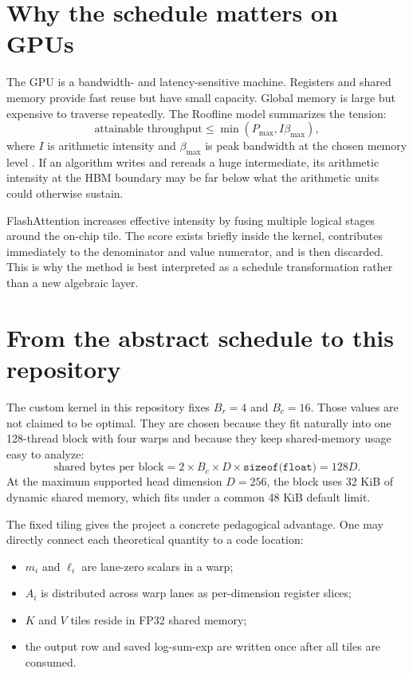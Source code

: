 \section{Why the schedule matters on GPUs}

The GPU is a bandwidth- and latency-sensitive machine. Registers and shared memory provide fast reuse but have small capacity. Global memory is large but expensive to traverse repeatedly. The Roofline model summarizes the tension:
\begin{equation}
  \text{attainable throughput} \le \min(P_{\max}, I \beta_{\max}),
\end{equation}
where $I$ is arithmetic intensity and $\beta_{\max}$ is peak bandwidth at the chosen memory level \citep{williams2009roofline}. If an algorithm writes and rereads a huge intermediate, its arithmetic intensity at the HBM boundary may be far below what the arithmetic units could otherwise sustain.

FlashAttention increases effective intensity by fusing multiple logical stages around the on-chip tile. The score exists briefly inside the kernel, contributes immediately to the denominator and value numerator, and is then discarded. This is why the method is best interpreted as a schedule transformation rather than a new algebraic layer.

\section{From the abstract schedule to this repository}

The custom kernel in this repository fixes $B_r=4$ and $B_c=16$. Those values are not claimed to be optimal. They are chosen because they fit naturally into one 128-thread block with four warps and because they keep shared-memory usage easy to analyze:
\begin{equation}
  \text{shared bytes per block}
  = 2 \times B_c \times D \times \texttt{sizeof(float)}
  = 128D.
\end{equation}
At the maximum supported head dimension $D=256$, the block uses 32 KiB of dynamic shared memory, which fits under a common 48 KiB default limit.

The fixed tiling gives the project a concrete pedagogical advantage. One may directly connect each theoretical quantity to a code location:
\begin{itemize}
  \item $m_i$ and $\ell_i$ are lane-zero scalars in a warp;
  \item $A_i$ is distributed across warp lanes as per-dimension register slices;
  \item $K$ and $V$ tiles reside in FP32 shared memory;
  \item the output row and saved log-sum-exp are written once after all tiles are consumed.
\end{itemize}

